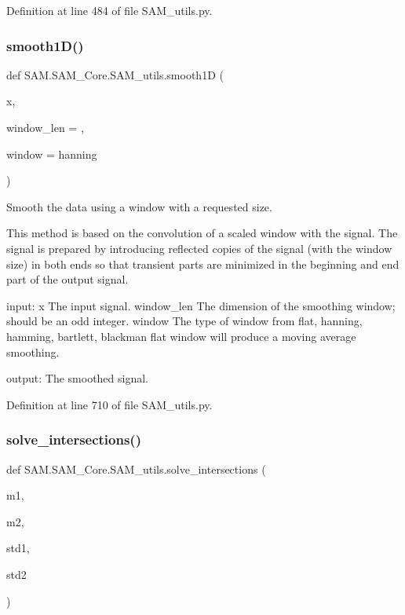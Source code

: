 Definition at line 484 of file S\+A\+M\+\_\+utils.\+py.

\mbox{\label{group__icubclient__SAM__utils_ga993c63ecfc9099d2e2ccd42282354de5}} 
\subsubsection{\texorpdfstring{smooth1\+D()}{smooth1D()}}
{\footnotesize\ttfamily def S\+A\+M.\+S\+A\+M\+\_\+\+Core.\+S\+A\+M\+\_\+utils.\+smooth1D (\begin{DoxyParamCaption}\item[{}]{x,  }\item[{}]{window\+\_\+len = {},  }\item[{}]{window = {\ttfamily \textquotesingle{}hanning\textquotesingle{}} }\end{DoxyParamCaption})}



Smooth the data using a window with a requested size. 

This method is based on the convolution of a scaled window with the signal. The signal is prepared by introducing reflected copies of the signal (with the window size) in both ends so that transient parts are minimized in the beginning and end part of the output signal.

input\+: x The input signal. window\+\_\+len The dimension of the smoothing window; should be an odd integer. window The type of window from \textquotesingle{}flat\textquotesingle{}, \textquotesingle{}hanning\textquotesingle{}, \textquotesingle{}hamming\textquotesingle{}, \textquotesingle{}bartlett\textquotesingle{}, \textquotesingle{}blackman\textquotesingle{} flat window will produce a moving average smoothing.

output\+: The smoothed signal. 

Definition at line 710 of file S\+A\+M\+\_\+utils.\+py.

\mbox{\label{group__icubclient__SAM__utils_gab49784000971804130fa10c1e3ad817d}} 
\subsubsection{\texorpdfstring{solve\+\_\+intersections()}{solve\_intersections()}}
{\footnotesize\ttfamily def S\+A\+M.\+S\+A\+M\+\_\+\+Core.\+S\+A\+M\+\_\+utils.\+solve\+\_\+intersections (\begin{DoxyParamCaption}\item[{}]{m1,  }\item[{}]{m2,  }\item[{}]{std1,  }\item[{}]{std2 }\end{DoxyParamCaption})}



